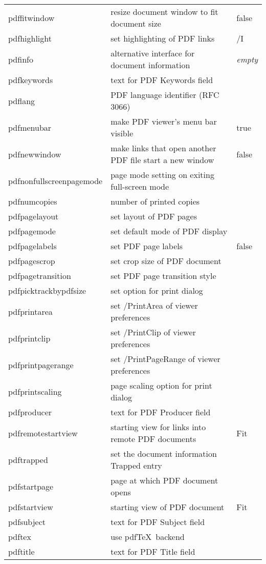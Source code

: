 \documentclass[a4paper,11pt]{article}
\newcommand{\optempty}{{\rmfamily\textit{empty}}}
\newcommand{\optrelax}{{\rmfamily\textit{relax}}}
\begin{document}
\begin{longtable}{@{}>{\ttfamily}lp{70mm}>{\ttfamily}l@{}}
pdffitwindow &resize document window to fit document size&false\\
pdfhighlight &set highlighting of PDF links& /I\\
pdfinfo & alternative interface for document information & \optempty\\
pdfkeywords &text for PDF Keywords field&\optempty\\
pdflang &PDF language identifier (RFC 3066)&\optrelax\\
pdfmenubar &make PDF  viewer's menu bar visible&true\\
pdfnewwindow &make links that open another PDF file start a new window&false\\
pdfnonfullscreenpagemode &page mode setting on exiting full-screen mode&\optempty\\
pdfnumcopies &number of printed copies&\optempty\\
pdfpagelayout &set layout of PDF pages&\optempty\\
pdfpagemode &set default mode of PDF display&\optempty\\
pdfpagelabels &set PDF page labels&false\\
pdfpagescrop &set crop size of PDF document&\optempty\\
pdfpagetransition &set PDF page transition style&\optempty\\
pdfpicktrackbypdfsize &set option for print dialog&\optempty\\
pdfprintarea &set /PrintArea of viewer preferences&\optempty\\
pdfprintclip &set /PrintClip of viewer preferences&\optempty\\
pdfprintpagerange &set /PrintPageRange of viewer preferences&\optempty\\
pdfprintscaling &page scaling option for print dialog&\optempty\\
pdfproducer &text for PDF Producer field&\optempty\\
pdfremotestartview & starting view for links into remote PDF documents&Fit\\
pdftrapped & set the document information Trapped entry&\optempty\\
pdfstartpage &page at which PDF document opens&1\\
pdfstartview &starting view of PDF document& Fit\\
pdfsubject &text for PDF Subject field&\optempty\\
pdftex &use pdf\TeX\ backend\\
pdftitle &text for PDF Title field&\optempty\\

\end{longtable}
\end{document}
